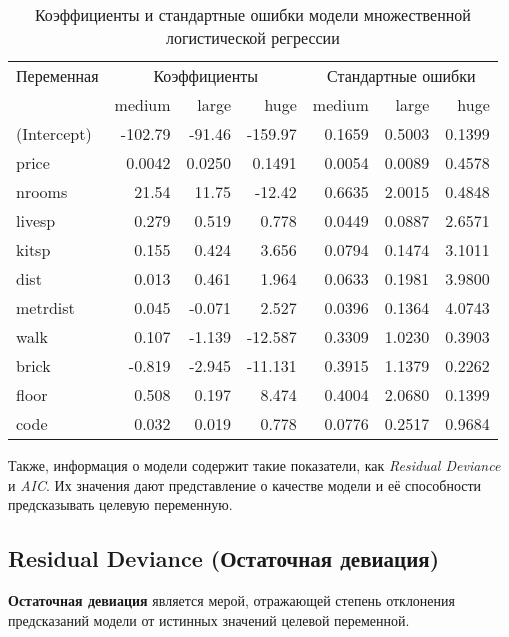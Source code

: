 \begin{table}[h]
	\centering
	\caption{Коэффициенты и стандартные ошибки модели множественной логистической регрессии}
	\begin{tabular}{@{}l|rrr|rrr@{}}
		\toprule
		Переменная & \multicolumn{3}{c|}{Коэффициенты} & \multicolumn{3}{c}{Стандартные ошибки} \\ \cmidrule{2-4} \cmidrule{5-7}
		& medium & large & huge & medium & large & huge \\ \midrule
		(Intercept) & -102.79 & -91.46 & -159.97 & 0.1659 & 0.5003 & 0.1399 \\
		price       & 0.0042  & 0.0250 & 0.1491  & 0.0054 & 0.0089 & 0.4578 \\
		nrooms      & 21.54   & 11.75  & -12.42  & 0.6635 & 2.0015 & 0.4848 \\
		livesp      & 0.279   & 0.519  & 0.778   & 0.0449 & 0.0887 & 2.6571 \\
		kitsp       & 0.155   & 0.424  & 3.656   & 0.0794 & 0.1474 & 3.1011 \\
		dist        & 0.013   & 0.461  & 1.964   & 0.0633 & 0.1981 & 3.9800 \\
		metrdist    & 0.045   & -0.071 & 2.527   & 0.0396 & 0.1364 & 4.0743 \\
		walk        & 0.107   & -1.139 & -12.587 & 0.3309 & 1.0230 & 0.3903 \\
		brick       & -0.819  & -2.945 & -11.131 & 0.3915 & 1.1379 & 0.2262 \\
		floor       & 0.508   & 0.197  & 8.474   & 0.4004 & 2.0680 & 0.1399 \\
		code        & 0.032   & 0.019  & 0.778   & 0.0776 & 0.2517 & 0.9684 \\ \bottomrule
	\end{tabular}
\end{table}


Также, информация о модели содержит такие показатели, как \textit{Residual Deviance} и \textit{AIC}.
 Их значения дают представление о качестве модели и её способности предсказывать целевую переменную.

\subsection*{Residual Deviance (Остаточная девиация)}

\textbf{Остаточная девиация} является мерой, отражающей степень отклонения предсказаний модели от истинных значений целевой переменной.

